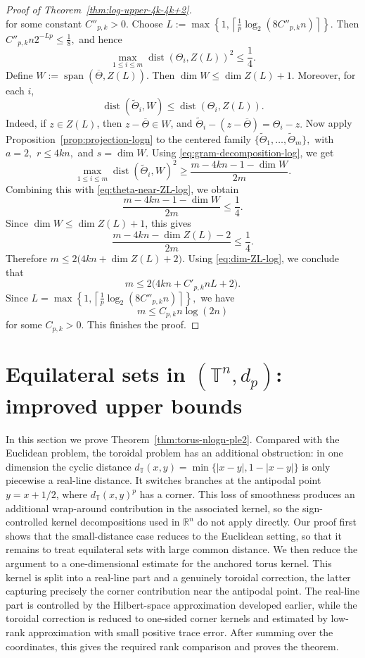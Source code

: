 \documentclass[11pt]{article}
\theoremstyle{definition}
\newcommand{\T}{\mathbb T}
\begin{document}
\begin{proof}[Proof of Theorem~\ref{thm:log-upper-4k-4k+2}]
\[\]
for some constant $C''_{p,k}>0$. Choose
\(
L:=\max\left\{1,\left\lceil \frac1p\log_2(8C''_{p,k}n)\right\rceil\right\}.
\)
Then
\(
C''_{p,k}n2^{-Lp}\le \frac18,
\)
and hence
\begin{equation}\label{eq:theta-near-ZL-log}
\max_{1\le i\le m}\operatorname{dist}(\Theta_i,Z(L))^2\le \frac14.
\end{equation}
Define
\(
W:=\operatorname{span}(\overline\Theta,Z(L)).
\)
Then
\(
\dim W\le \dim Z(L)+1.
\)
Moreover, for each $i$,
\[
\operatorname{dist}(\widetilde\Theta_i,W)\le \operatorname{dist}(\Theta_i,Z(L)).
\]
Indeed, if $z\in Z(L)$, then $z-\overline\Theta\in W$, and
\(
\widetilde\Theta_i-(z-\overline\Theta)=\Theta_i-z.
\)
Now apply Proposition~\ref{prop:projection-logn} to the centered family
\(
\{\widetilde\Theta_1,\dots,\widetilde\Theta_m\},
\)
with
\(
a=2,
\) \(
r\le 4kn,
\)
and
\(
s=\dim W.
\)
Using \eqref{eq:gram-decomposition-log}, we get
\[
\max_{1\le i\le m}\operatorname{dist}(\widetilde\Theta_i,W)^2
\ge
\frac{m-4kn-1-\dim W}{2m}.
\]
Combining this with \eqref{eq:theta-near-ZL-log}, we obtain
\[
\frac{m-4kn-1-\dim W}{2m}\le \frac14.
\]
Since $\dim W\le \dim Z(L)+1$, this gives
\[
\frac{m-4kn-\dim Z(L)-2}{2m}\le \frac14.
\]
Therefore
\(
m\le 2\bigl(4kn+\dim Z(L)+2\bigr).
\)
Using \eqref{eq:dim-ZL-log}, we conclude that
\[
m\le 2\bigl(4kn+C'_{p,k}nL+2\bigr).
\]
Since
\(
L=\max\left\{1,\left\lceil \frac1p\log_2(8C''_{p,k}n)\right\rceil\right\},
\)
we have
\[
m\le C_{p,k}n\log(2n)
\]
for some \(C_{p,k}>0\). This finishes the proof.

\end{proof}

\section{Equilateral sets in \((\T^{n},d_p)\): improved upper bounds}
In this section we prove Theorem~\ref{thm:torus-nlogn-ple2}.  Compared with the
Euclidean problem, the toroidal problem has an additional obstruction: in one
dimension the cyclic distance
\(
d_{\mathbb T}(x,y)=\min\{|x-y|,1-|x-y|\}
\)
is only piecewise a real-line distance.  It switches branches at the antipodal
point \(y=x+1/2\), where \(d_{\mathbb T}(x,y)^p\) has a corner.  This loss of
smoothness produces an additional wrap-around contribution in the associated
kernel, so the sign-controlled kernel decompositions used in \(\mathbb R^n\) do
not apply directly.  Our proof first shows that the small-distance case reduces
to the Euclidean setting, so that it remains to treat equilateral sets with
large common distance.  We then reduce the argument to a one-dimensional
estimate for the anchored torus kernel.  This kernel is split into a real-line
part and a genuinely toroidal correction, the latter capturing precisely the
corner contribution near the antipodal point.  The real-line part is controlled
by the Hilbert-space approximation developed earlier, while the toroidal
correction is reduced to one-sided corner kernels and estimated by low-rank
approximation with small positive trace error.  After summing over the
coordinates, this gives the required rank comparison and proves the theorem.
\end{document}
